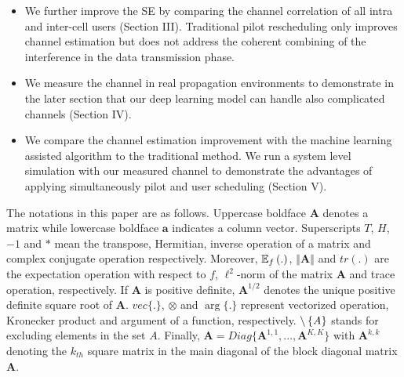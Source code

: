 \begin{itemize}
\item We further improve the SE by comparing the channel correlation of all intra and inter-cell users (Section III). Traditional pilot rescheduling only improves channel estimation but does not address the coherent combining of the interference in the data transmission phase.
\item We measure the channel in real propagation environments to demonstrate in the later section that our deep learning model can handle also complicated channels (Section IV). 
\item We compare the channel estimation improvement with the machine learning assisted algorithm to the traditional method. We run a system level simulation with our measured channel to demonstrate the advantages of applying simultaneously pilot and user scheduling (Section V).
\end{itemize}
The notations in this paper are as follows. Uppercase boldface $\mathbf{A}$ denotes a matrix while lowercase
boldface $\mathbf{a}$ indicates a column vector.
Superscripts $T$, $H$, $-1$ and $*$ mean the transpose, Hermitian, inverse operation of a matrix and complex conjugate operation respectively. Moreover, $\operatorname{\mathbb{E}}_f{(.)}$, $\left\Vert\mathbf{A}\right\Vert$ and $tr(.)$ are the expectation operation with respect to $f$, $\ell^2$-norm of the matrix $\mathbf{A}$ and trace operation, respectively. If $\mathbf{A}$ is positive definite, $\mathbf{A}^{1/2}$ denotes the unique positive definite square root of $\mathbf{A}$.  $vec\{.\}$, $\otimes$ and $\arg\{.\}$ represent vectorized operation, Kronecker product and argument of a function, respectively. $\char`\\ \left\{\mathit{A}\right\}$ stands for excluding elements in the set $\mathit{A}$. Finally,  $\mathbf{A} = Diag\{\mathbf{A}^{1,1},...,\mathbf{A}^{K,K}\}$ with $\mathbf{A}^{k,k}$ denoting the $k_{th}$  square matrix in the main diagonal of the block diagonal matrix $\mathbf{A}$.